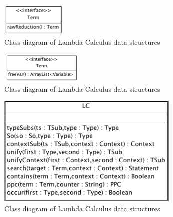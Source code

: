 \begin{figure}[ht]
\centering
\includegraphics[scale=0.7]{pics/TermRaw}
\caption{Class diagram of Lambda Calculus data structures}
\label{fig:term1}
\end{figure}


\begin{figure}
\centering
\includegraphics[scale=0.7]{pics/TermType}
\caption{Class diagram of Lambda Calculus data structures}
\label{fig:term1}
\end{figure}



\begin{figure}
\centering
\includegraphics[scale=0.6]{pics/LCType}
\caption{Class diagram of Lambda Calculus data structures}
\label{fig:term1}
\end{figure}


